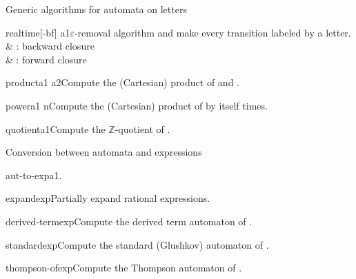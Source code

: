 \begin{fnsection}{Generic algorithms for automata on letters}
\item{realtime}{[-bf] a1}{$\varepsilon$-removal algorithm and make
    every transition labeled by a letter.}
  &  : backward closure\\
  &  : forward closure\\
\item{product}{a1 a2}{Compute the (Cartesian) product of  and
    .}
\item{power}{a1 n}{Compute the (Cartesian) product of  by
    itself  times.}
\item{quotient}{a1}{Compute the $\mathbb{Z}$-quotient of .}
  \hline
\end{fnsection}

\begin{fnsection}{Conversion between automata and expressions}
\item{aut-to-exp}{a1}{.}%
\item{expand}{exp}{Partially expand rational expressions.}
\item{derived-term}{exp}{Compute the derived term automaton of
    .}
\item{standard}{exp}{Compute the standard (Glushkov) automaton of
    .}
\item{thompson-of}{exp}{Compute the Thompson automaton of .}
  \hline
\end{fnsection}




